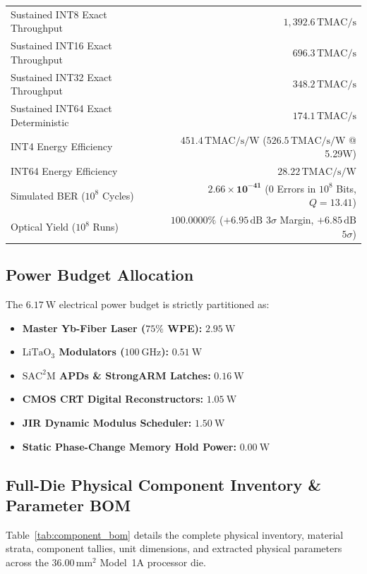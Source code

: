 \documentclass[journal]{IEEEtran}
\begin{document}
\begin{table}[!htbp]
\begin{tabularx}{\columnwidth}{>{\raggedright\arraybackslash}X r}
Sustained INT8 Exact Throughput & $1,392.6\,\mathrm{TMAC/s}$ \\
Sustained INT16 Exact Throughput & $696.3\,\mathrm{TMAC/s}$ \\
Sustained INT32 Exact Throughput & $348.2\,\mathrm{TMAC/s}$ \\
Sustained INT64 Exact Deterministic & $\mathbf{174.1\,\mathrm{TMAC/s}}$ \\
\midrule
INT4 Energy Efficiency & $\mathbf{451.4\,\mathrm{TMAC/s/W}}$ ($526.5\,\mathrm{TMAC/s/W}$ @ 5.29W) \\
INT64 Energy Efficiency & $\mathbf{28.22\,\mathrm{TMAC/s/W}}$ \\
Simulated BER ($10^8$ Cycles) & $\mathbf{2.66 \times 10^{-41}}$ ($0$ Errors in $10^8$ Bits, $Q=13.41$) \\
Optical Yield ($10^8$ Runs) & $\mathbf{100.0000\%}$ ($+6.95\,\mathrm{dB}$ $3\sigma$ Margin, $+6.85\,\mathrm{dB}$ $5\sigma$) \\
\bottomrule
\end{tabularx}
\end{table}

\subsection{Power Budget Allocation}
The $6.17~\mathrm{W}$ electrical power budget is strictly partitioned as:
\begin{itemize}
    \item \textbf{Master Yb-Fiber Laser ($75\%$ WPE):} $2.95~\mathrm{W}$
    \item \textbf{$\mathrm{LiTaO_3}$ Modulators ($100~\mathrm{GHz}$):} $0.51~\mathrm{W}$
    \item \textbf{$\mathrm{SAC^2M}$ APDs \& StrongARM Latches:} $0.16~\mathrm{W}$
    \item \textbf{CMOS CRT Digital Reconstructors:} $1.05~\mathrm{W}$
    \item \textbf{JIR Dynamic Modulus Scheduler:} $1.50~\mathrm{W}$
    \item \textbf{Static Phase-Change Memory Hold Power:} $\mathbf{0.00~\mathrm{W}}$
\end{itemize}

\subsection{Full-Die Physical Component Inventory \& Parameter BOM}
Table~\ref{tab:component_bom} details the complete physical inventory, material strata, component tallies, unit dimensions, and extracted physical parameters across the $36.00\,\mathrm{mm^2}$ Model~1A processor die.
\end{document}
